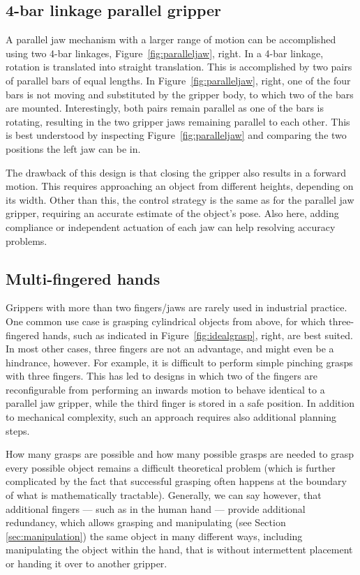 \subsection{4-bar linkage parallel gripper}
A parallel jaw mechanism with a larger range of motion can be accomplished using two 4-bar linkages, Figure~\ref{fig:paralleljaw}, right. In a 4-bar linkage, rotation is translated into  straight translation. This is accomplished by two pairs of parallel bars of equal lengths. In Figure~\ref{fig:paralleljaw}, right, one of the four bars is not moving and substituted by the gripper body, to which two of the bars are mounted. Interestingly, both pairs remain parallel as one of the bars is rotating, resulting in the two gripper jaws remaining parallel to each other. This is best understood by inspecting Figure~\ref{fig:paralleljaw} and comparing the two positions the left jaw can be in. 


The drawback of this design is that closing the gripper also results in a forward motion. This requires approaching an object from different heights, depending on its width. Other than this, the control strategy is the same as for the parallel jaw gripper, requiring an accurate estimate of the object's pose. Also here, adding compliance or independent actuation of each jaw can help resolving accuracy problems. 

\subsection{Multi-fingered hands}
Grippers with more than two fingers/jaws are rarely used in industrial practice. One common use case is grasping cylindrical objects from above, for which three-fingered hands, such as indicated in Figure~\ref{fig:idealgrasp}, right, are best suited. In most other cases, three fingers are not an advantage, and might even be a hindrance, however. For example, it is difficult to perform simple pinching grasps with three fingers. This has led to designs in which two of the fingers are reconfigurable from performing an inwards motion to behave identical to a parallel jaw gripper, while the third finger is stored in a safe position. In addition to mechanical complexity, such an approach requires also additional planning steps. 

How many grasps are possible and how many possible grasps are needed to grasp every possible object remains a difficult theoretical problem (which is further complicated by the fact that successful grasping often happens at the boundary of what is mathematically tractable). Generally, we can say however, that additional fingers --- such as in the human hand --- provide additional redundancy, which allows grasping and manipulating (see Section \ref{sec:manipulation}) the same object in many different ways, including manipulating the object within the hand, that is without intermettent placement or handing it over to another gripper. 


